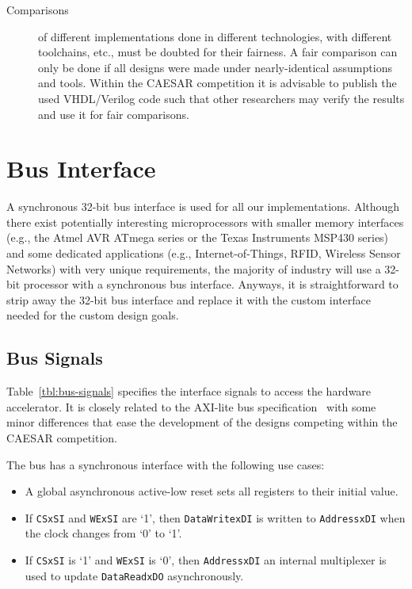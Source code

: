\documentclass[runningheads]{llncs}
\begin{document}
\begin{description}
\item[Comparisons] of different implementations done in different technologies, with different toolchains, etc., must be doubted for their fairness. A fair comparison can only be done if all designs were made under nearly-identical assumptions and tools. Within the CAESAR competition it is advisable to publish the used VHDL/Verilog code such that other researchers may verify the results and use it for fair comparisons. 
\end{description}

\section{Bus Interface}

A synchronous 32-bit bus interface is used for all our implementations. Although there exist potentially interesting microprocessors with smaller memory interfaces (e.g., the Atmel AVR ATmega series or the Texas Instruments MSP430 series) and some dedicated applications (e.g., Internet-of-Things, RFID, Wireless Sensor Networks) with very unique requirements, the majority of industry will use a 32-bit processor with a synchronous bus interface. Anyways, it is straightforward to strip away the 32-bit bus interface and replace it with the custom interface needed for the custom design goals. 

\subsection{Bus Signals}

Table~\ref{tbl:bus-signals} specifies the interface signals to access the hardware accelerator. It is closely related to the AXI-lite bus specification~\cite{} with some minor differences that ease the development of the designs competing within the CAESAR competition.  

The bus has a synchronous interface with the following use cases:
\begin{itemize}
\item A global asynchronous active-low reset sets all registers to their initial value. 
\item If \texttt{CSxSI} and \texttt{WExSI} are `1', then \texttt{DataWritexDI} is written to \texttt{AddressxDI} when the clock changes from `0' to `1'.
\item If \texttt{CSxSI} is `1' and \texttt{WExSI} is `0', then \texttt{AddressxDI} an internal multiplexer is used to update \texttt{DataReadxDO} asynchronously.
\end{itemize}
\end{document}
